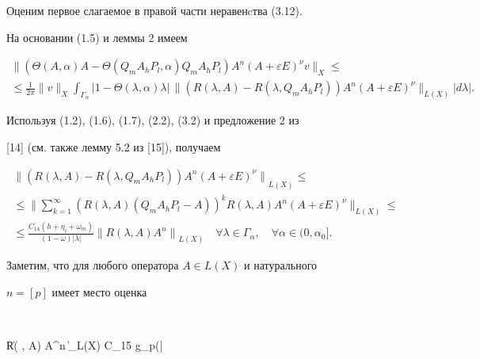 Оценим первое слагаемое в правой части неравенcтва (3.12).


На основании (1.5) и леммы 2 имеем


\begin{multline}


{\| (\Theta (A, \alpha)A- \Theta (Q_m A_h P_l, \alpha) Q_m A_h P_l)


A^n {(A+ \varepsilon E)}^{\nu} v \|_X} \leq \\


\leq \frac{1}{2 \pi} \| v \|_X \int_{ \Gamma_{ \alpha}}


| 1- \Theta( \lambda, \alpha) \lambda |\,


\| (R( \lambda, A)- R( \lambda, Q_m A_h P_l)) 


A^n {(A + \varepsilon E)}^{\nu} \|_{L(X)}


| d \lambda | .


\tag{3.13}


\end{multline}


Используя (1.2), (1.6), (1.7), (2.2), (3.2) и предложение 2 из


[14] (см. также лемму 5.2 из [15]), получаем


\begin{multline*}


{\| (R( \lambda, A)- R( \lambda, Q_m A_h P_l))


A^n {(A + \varepsilon E)}^{\nu} \|}_{L(X)} \leq \\


\leq \bigg \| \sum_{k=1}^{\infty}(R(\lambda, A)(Q_m A_h P_l - A))^k


R(\lambda, A) A^n {(A + \varepsilon E)}^{\nu} \bigg \|_{L(X)} \leq \\


\leq \frac{C_{14}(h + \eta_l + \omega_m)} {(1- \omega) |


\lambda |} {\| R( \lambda, A) A^n \|}_{L(X)} \quad


\forall \lambda \in \Gamma_{\alpha}, \quad \forall


\alpha \in (0, \alpha_0].


\end{multline*}


Заметим, что для любого оператора $A \in L(X)$ и натурального


$n=[p]$ имеет место оценка


$$


\| R( \lambda, A) A^n \|_{L(X)} \leq C_{15} g_p(| \lambda


